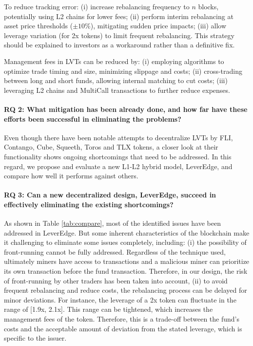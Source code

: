 To reduce tracking error: (i) increase rebalancing frequency to \(n\) blocks, potentially using L2 chains for lower fees; (ii) perform interim rebalancing at asset price thresholds (\eg \(\pm10\%\)), mitigating sudden price impacts; (iii) allow leverage variation (\eg [1.95x, 2.05x] for 2x tokens) to limit frequent rebalancing. This strategy should be explained to investors as a workaround rather than a definitive fix.

Management fees in LVTs can be reduced by: (i) employing algorithms to optimize trade timing and size, minimizing slippage and costs; (ii) cross-trading between long and short funds, allowing internal matching to cut costs; (iii) leveraging L2 chains and MultiCall transactions to further reduce expenses.
	
\paragraph{RQ 2: What mitigation has been already done, and how far have these efforts been successful in eliminating the problems?} Even though there have been notable attempts to decentralize LVTs by FLI, Contango, Cube, Squeeth, Toros and TLX tokens, a closer look at their functionality shows ongoing shortcomings that need to be addressed. In this regard, we propose and evaluate a new L1-L2 hybrid model, LeverEdge, and compare how well it performs against others.
	
\paragraph{RQ 3: Can a new decentralized design, LeverEdge, succeed in effectively eliminating the existing shortcomings?} As shown in Table \ref{tab:compare}, most of the identified issues have been addressed in LeverEdge. But some inherent characteristics of the blockchain make it challenging to eliminate some issues completely, including: (i) the possibility of front-running cannot be fully addressed. Regardless of the technique used, ultimately miners have access to transactions and a malicious miner can prioritize its own transaction before the fund transaction. Therefore, in our design, the risk of front-running by other traders has been taken into account, (ii) to avoid frequent rebalancing and reduce costs, the rebalancing process can be delayed for minor deviations. For instance, the leverage of a 2x token can fluctuate in the range of [1.9x, 2.1x]. This range can be tightened, which increases the management fees of the token. Therefore, this is a trade-off between the fund's costs and the acceptable amount of deviation from the stated leverage, which is specific to the issuer.
	

